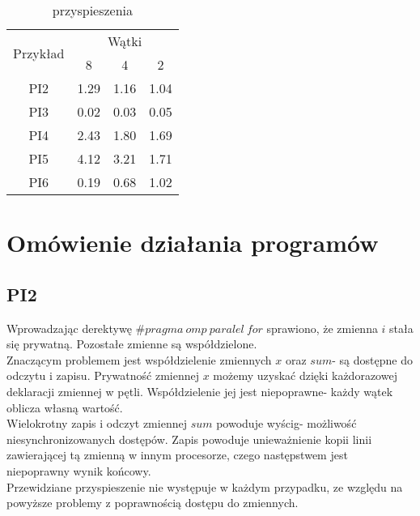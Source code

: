 \documentclass{article}
\begin{document}
\begin{table}[!htb]
\centering
\begin{tabular}{|c|l|l|l|}
\hline
\multirow{2}{*}{Przykład} & \multicolumn{3}{c|}{Wątki}                                               \\ \cline{2-4} 
                          & \multicolumn{1}{c|}{8} & \multicolumn{1}{c|}{4} & \multicolumn{1}{c|}{2} \\ \hline
PI2                       & 1.29                   & 1.16                   & 1.04                   \\ \hline
PI3                       & 0.02                   & 0.03                   & 0.05                   \\ \hline
PI4                       & 2.43                   & 1.80                   & 1.69                   \\ \hline
PI5                       & 4.12                   & 3.21                   & 1.71                   \\ \hline
PI6                       & 0.19                   & 0.68                   & 1.02                   \\ \hline
\end{tabular}
\caption{przyspieszenia}
\end{table}

\newpage

\section{Omówienie działania programów}
\subsection{PI2}
Wprowadzając derektywę $\#pragma\:omp\:paralel\:for$ sprawiono, że zmienna $i$ stała się prywatną. Pozostałe zmienne są współdzielone.\\
Znaczącym problemem jest współdzielenie zmiennych $x$ oraz $sum$- są dostępne do odczytu i zapisu. Prywatność zmiennej $x$ możemy uzyskać dzięki każdorazowej deklaracji zmiennej w pętli. Współdzielenie jej jest niepoprawne- każdy wątek oblicza własną wartość. \\
Wielokrotny zapis i odczyt zmiennej $sum$ powoduje wyścig- możliwość niesynchronizowanych dostępów. Zapis powoduje unieważnienie kopii linii zawierającej tą zmienną w innym procesorze, czego następstwem jest niepoprawny wynik końcowy.\\
Przewidziane przyspieszenie nie występuje w każdym przypadku, ze względu na powyższe problemy z poprawnością dostępu do zmiennych.
\end{document}
